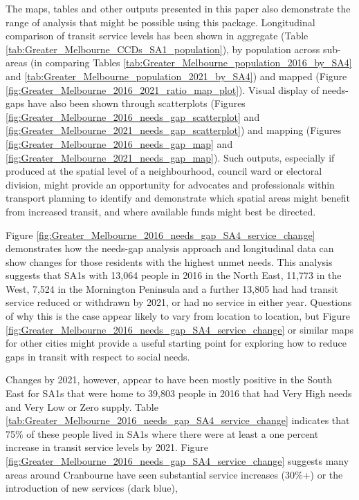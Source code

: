 \documentclass[preprint, 3p,
authoryear]{elsarticle} %
\begin{document}
The maps, tables and other outputs presented in this paper also
demonstrate the range of analysis that might be possible using this
package. Longitudinal comparison of transit service levels has been
shown in aggregate (Table
\ref{tab:Greater_Melbourne_CCDs_SA1_population}), by population across
sub-areas (in comparing Tables
\ref{tab:Greater_Melbourne_population_2016_by_SA4} and
\ref{tab:Greater_Melbourne_population_2021_by_SA4}) and mapped (Figure
\ref{fig:Greater_Melbourne_2016_2021_ratio_map_plot}). Visual display of
needs-gaps have also been shown through scatterplots (Figures
\ref{fig:Greater_Melbourne_2016_needs_gap_scatterplot} and
\ref{fig:Greater_Melbourne_2021_needs_gap_scatterplot}) and mapping
(Figures \ref{fig:Greater_Melbourne_2016_needs_gap_map} and
\ref{fig:Greater_Melbourne_2021_needs_gap_map}). Such outputs,
especially if produced at the spatial level of a neighbourhood, council
ward or electoral division, might provide an opportunity for advocates
and professionals within transport planning to identify and demonstrate
which spatial areas might benefit from increased transit, and where
available funds might best be directed.

Figure \ref{fig:Greater_Melbourne_2016_needs_gap_SA4_service_change}
demonstrates how the needs-gap analysis approach and longitudinal data
can show changes for those residents with the highest unmet needs. This
analysis suggests that SA1s with 13,064 people in 2016 in the North
East, 11,773 in the West, 7,524 in the Mornington Peninsula and a
further 13,805 had had transit service reduced or withdrawn by 2021, or
had no service in either year. Questions of why this is the case appear
likely to vary from location to location, but Figure
\ref{fig:Greater_Melbourne_2016_needs_gap_SA4_service_change} or similar
maps for other cities might provide a useful starting point for
exploring how to reduce gaps in transit with respect to social needs.

Changes by 2021, however, appear to have been mostly positive in the
South East for SA1s that were home to 39,803 people in 2016 that had
Very High needs and Very Low or Zero supply. Table
\ref{tab:Greater_Melbourne_2016_needs_gap_SA4_service_change} indicates
that 75\% of these people lived in SA1s where there were at least a one
percent increase in transit service levels by 2021. Figure
\ref{fig:Greater_Melbourne_2016_needs_gap_SA4_service_change} suggests
many areas around Cranbourne have seen substantial service increases
(30\%+) or the introduction of new services (dark blue),
\end{document}
